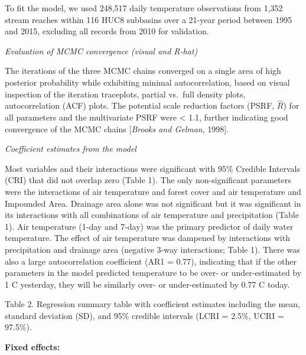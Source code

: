 To fit the model, we used 248,517 daily temperature observations from
1,352 stream reaches within 116 HUC8 subbasins over a 21-year period
between 1995 and 2015, excluding all records from 2010 for validation.

\emph{Evaluation of MCMC convergence (visual and R-hat)}

The iterations of the three MCMC chains converged on a single area of
high posterior probability while exhibiting minimal autocorrelation,
based on visual inspection of the iteration traceplots, partial vs.~full
density plots, autocorrelation (ACF) plots. The potential scale
reduction factors (PSRF, \(\hat{R}\)) for all parameters and the
multivariate PSRF were \textless{} 1.1, further indicating good
convergence of the MCMC chains {[}\emph{Brooks and Gelman}, 1998{]}.

\emph{Coefficient estimates from the model}

Most variables and their interactions were significant with 95\%
Credible Intervals (CRI) that did not overlap zero (Table 1). The only
non-significant parameters were the interactions of air temperature and
forest cover and air temperature and Impounded Area. Drainage area alone
was not significant but it was significant in its interactions with all
combinations of air temperature and precipitation (Table 1). Air
temperature (1-day and 7-day) was the primary predictor of daily water
temperature. The effect of air temperature was dampened by interactions
with precipitation and drainage area (negative 3-way interactions; Table
1). There was also a large autocorrelation coefficient (AR1 = 0.77),
indicating that if the other parameters in the model predicted
temperature to be over- or under-estimated by 1 C yesterday, they will
be similarly over- or under-estimated by 0.77 C today.

Table 2. Regression summary table with coefficient estimates including
the mean, standard deviation (SD), and 95\% credible intervals (LCRI =
2.5\%, UCRI = 97.5\%).

\textbf{Fixed effects:}

